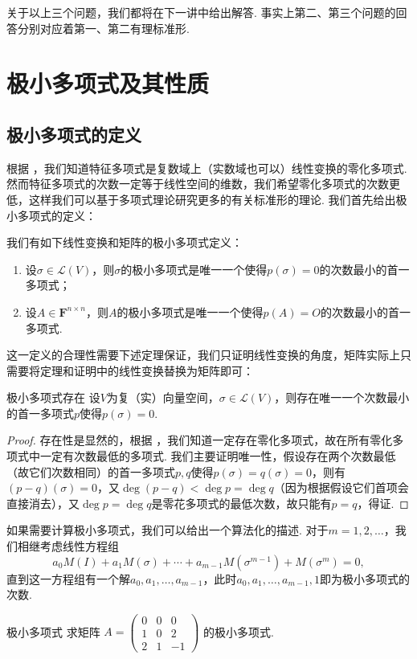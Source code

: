 关于以上三个问题，我们都将在下一讲中给出解答. 事实上第二、第三个问题的回答分别对应着第一、第二有理标准形.

\section{极小多项式及其性质}
\subsection{极小多项式的定义}

根据 ，我们知道特征多项式是复数域上（实数域也可以）线性变换的零化多项式. 然而特征多项式的次数一定等于线性空间的维数，我们希望零化多项式的次数更低，这样我们可以基于多项式理论研究更多的有关标准形的理论. 我们首先给出极小多项式的定义：
\begin{definition}{}{}
    我们有如下线性变换和矩阵的极小多项式定义：
    \begin{enumerate}
        \item 设$\sigma\in \mathcal{L}(V)$，则$\sigma$的极小多项式是唯一一个使得$p(\sigma)=0$的次数最小的首一多项式；

        \item 设$A\in\mathbf{F}^{n\times n}$，则$A$的极小多项式是唯一一个使得$p(A)=O$的次数最小的首一多项式.
    \end{enumerate}
\end{definition}
这一定义的合理性需要下述定理保证，我们只证明线性变换的角度，矩阵实际上只需要将定理和证明中的线性变换替换为矩阵即可：
\begin{theorem}{}{极小多项式存在}
    设$V$为复（实）向量空间，$\sigma\in \mathcal{L}(V)$，则存在唯一一个次数最小的首一多项式$p$使得$p(\sigma)=0$.
\end{theorem}

\begin{proof}
    存在性是显然的，根据 ，我们知道一定存在零化多项式，故在所有零化多项式中一定有次数最低的多项式. 我们主要证明唯一性，假设存在两个次数最低（故它们次数相同）的首一多项式$p,q$使得$p(\sigma)=q(\sigma)=0$，则有$(p-q)(\sigma)=0$，又$\deg(p-q)<\deg p=\deg q$（因为根据假设它们首项会直接消去），又$\deg p=\deg q$是零花多项式的最低次数，故只能有$p=q$，得证.
\end{proof}

如果需要计算极小多项式，我们可以给出一个算法化的描述. 对于$m=1,2,\ldots$，我们相继考虑线性方程组
\[a_0M(I)+a_1M(\sigma)+\cdots+a_{m-1}M(\sigma^{m-1})+M(\sigma^m)=0,\]
直到这一方程组有一个解$a_0,a_1,\ldots,a_{m-1}$，此时$a_0,a_1,\ldots,a_{m-1},1$即为极小多项式的次数.
\begin{example}{}{极小多项式}
    求矩阵 $A = \begin{pmatrix}
            0 & 0 & 0 \\ 1 & 0 & 2 \\ 2 & 1 & -1
        \end{pmatrix}$ 的极小多项式.
\end{example}

